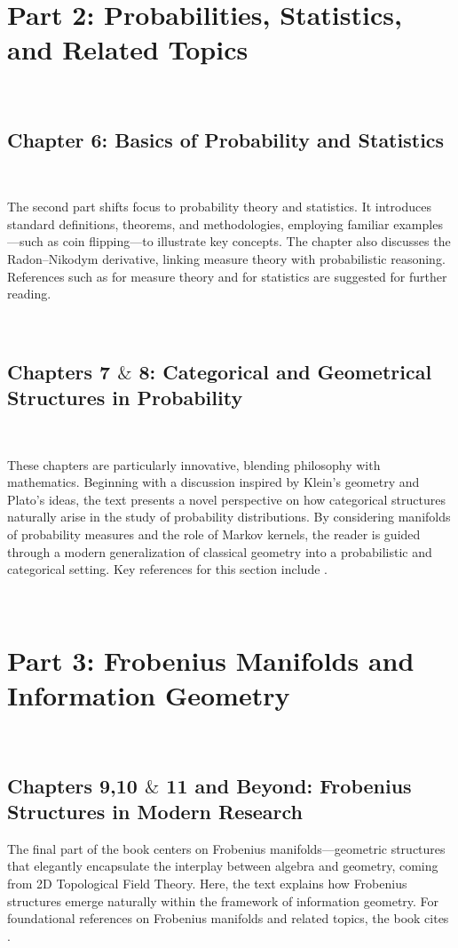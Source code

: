 \,

\section*{\bf Part 2: Probabilities, Statistics, and Related Topics}
\,

\subsection*{\bf Chapter 6: Basics of Probability and Statistics}~

The second part shifts focus to probability theory and statistics. It introduces standard definitions, theorems, and methodologies, employing familiar examples—such as coin flipping—to illustrate key concepts. The chapter also discusses the Radon–Nikodym derivative, linking measure theory with probabilistic reasoning. References such as \cite{Bi,Pa67} for measure theory and \cite{Fe66} for statistics are suggested for further reading.

\,

\subsection*{\bf  Chapters 7 $\&$ 8: Categorical and Geometrical Structures in Probability}~

These chapters are particularly innovative, blending philosophy with mathematics. Beginning with a discussion inspired by Klein’s geometry and Plato’s ideas, the text presents a novel perspective on how categorical structures naturally arise in the study of probability distributions. By considering manifolds of probability measures and the role of Markov kernels, the reader is guided through a modern generalization of classical geometry into a probabilistic and categorical setting. Key references for this section include \cite{Am85,Am97,MoCh89,MoCh91-1,MoCh91-2}.

\,

\section*{\bf Part 3: Frobenius Manifolds and Information Geometry}
\, 

\subsection*{\bf  Chapters 9,10 $\&$ 11 and Beyond: Frobenius Structures in Modern Research}
The final part of the book centers on Frobenius manifolds—geometric structures that elegantly encapsulate the interplay between algebra and geometry, coming from 2D Topological Field Theory. Here, the text explains how Frobenius structures emerge naturally within the framework of information geometry. For foundational references on Frobenius manifolds and related topics, the book cites \cite{Du,Man99}.

